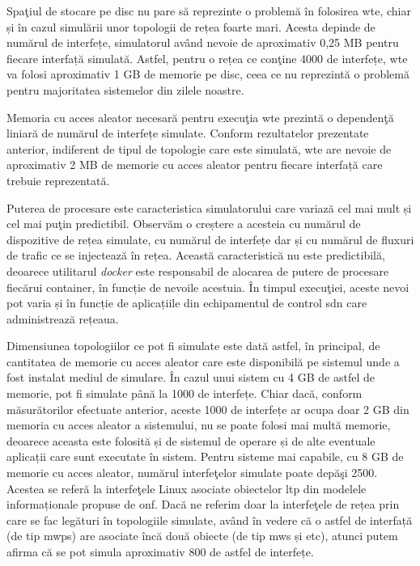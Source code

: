 Spaţiul de stocare pe disc nu pare să reprezinte o problemă în folosirea \gls{wte}, chiar și în cazul simulării unor topologii de rețea foarte mari. Acesta depinde de numărul de interfețe, simulatorul având nevoie de aproximativ 0,25 MB pentru fiecare interfață simulată. Astfel, pentru o rețea ce conţine 4000 de interfețe, \gls{wte} va folosi aproximativ 1 GB de memorie pe disc, ceea ce nu reprezintă o problemă pentru majoritatea sistemelor din zilele noastre.

Memoria cu acces aleator necesară pentru execuţia \gls{wte} prezintă o dependenţă liniară de numărul de interfețe simulate. Conform rezultatelor prezentate anterior, indiferent de tipul de topologie care este simulată, \gls{wte} are nevoie de aproximativ 2 MB de memorie cu acces aleator pentru fiecare interfață care trebuie reprezentată.

Puterea de procesare este caracteristica simulatorului care variază cel mai mult și cel mai puţin predictibil. Observăm o creștere a acesteia cu numărul de dispozitive de rețea simulate, cu numărul de interfețe dar și cu numărul de fluxuri de trafic ce se injectează în rețea. Această caracteristică nu este predictibilă, deoarece utilitarul \textit{docker} este responsabil de alocarea de putere de procesare fiecărui container, în funcție de nevoile acestuia. În timpul execuţiei, aceste nevoi pot varia și în funcție de aplicațiile din echipamentul de control \gls{sdn} care administrează rețeaua.

Dimensiunea topologiilor ce pot fi simulate este dată astfel, în principal, de cantitatea de memorie cu acces aleator care este disponibilă pe sistemul unde a fost instalat mediul de simulare. În cazul unui sistem cu 4 GB de astfel de memorie, pot fi simulate până la 1000 de interfețe. Chiar dacă, conform măsurătorilor efectuate anterior, aceste 1000 de interfețe ar ocupa doar 2 GB din memoria cu acces aleator a sistemului, nu se poate folosi mai multă memorie, deoarece aceasta este folosită și de sistemul de operare și de alte eventuale aplicații care sunt executate în sistem. Pentru sisteme mai capabile, cu 8 GB de memorie cu acces aleator, numărul interfeţelor simulate poate depăşi 2500. Acestea se referă la interfeţele Linux asociate obiectelor \gls{ltp} din modelele informaționale propuse de \gls{onf}. Dacă ne referim doar la interfeţele de rețea prin care se fac legături în topologiile simulate, având în vedere că o astfel de interfață (de tip \gls{mwps}) are asociate încă două obiecte (de tip \gls{mws} și \gls{etc}), atunci putem afirma că se pot simula aproximativ 800 de astfel de interfețe.

